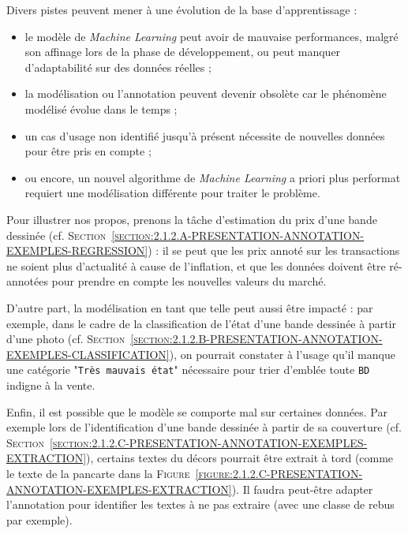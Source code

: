 			Divers pistes peuvent mener à une évolution de la base d'apprentissage :
			\begin{itemize}
				\item le modèle de \textit{Machine Learning} peut avoir de mauvaise performances, malgré son affinage lors de la phase de développement, ou peut manquer d'adaptabilité sur des données réelles ;
				\item la modélisation ou l'annotation peuvent devenir obsolète car le phénomène modélisé évolue dans le temps ;
				\item un cas d'usage non identifié jusqu'à présent nécessite de nouvelles données pour être pris en compte ;
				\item ou encore, un nouvel algorithme de \textit{Machine Learning} a priori plus performat requiert une modélisation différente pour traiter le problème.
			\end{itemize}
			\begin{leftBarExamples}
				Pour illustrer nos propos, prenons la tâche d'estimation du prix d'une bande dessinée (cf. \textsc{Section~\ref{section:2.1.2.A-PRESENTATION-ANNOTATION-EXEMPLES-REGRESSION}}) : il se peut que les prix annoté sur les transactions ne soient plus d'actualité à cause de l'inflation, et que les données doivent être ré-annotées pour prendre en compte les nouvelles valeurs du marché.
				
				D'autre part, la modélisation en tant que telle peut aussi être impacté : par exemple, dans le cadre de la classification de l'état d'une bande dessinée à partir d'une photo (cf. \textsc{Section~\ref{section:2.1.2.B-PRESENTATION-ANNOTATION-EXEMPLES-CLASSIFICATION}}), on pourrait constater à l'usage qu'il manque une catégorie "\texttt{Très mauvais état}" nécessaire pour trier d’emblée toute \texttt{BD} indigne à la vente.
				
				Enfin, il est possible que le modèle se comporte mal sur certaines données.
				Par exemple lors de l'identification d'une bande dessinée à partir de sa couverture (cf. \textsc{Section~\ref{section:2.1.2.C-PRESENTATION-ANNOTATION-EXEMPLES-EXTRACTION}}), certains textes du décors pourrait être extrait à tord (comme le texte de la pancarte  dans la \textsc{Figure~\ref{figure:2.1.2.C-PRESENTATION-ANNOTATION-EXEMPLES-EXTRACTION}}).
				Il faudra peut-être adapter l'annotation pour identifier les textes à ne pas extraire (avec une classe de rebus par exemple).
			\end{leftBarExamples}
			

